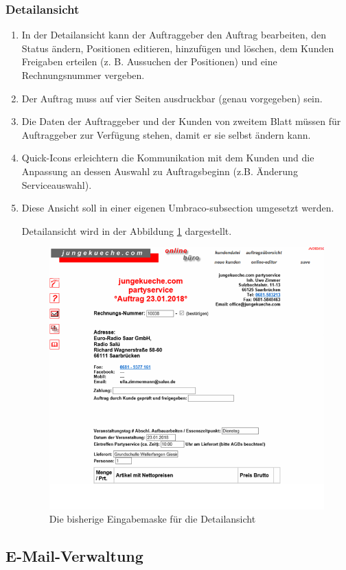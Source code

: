 \subsubsection{Detailansicht}

\begin{enumerate}
	\item In der Detailansicht kann der Auftraggeber den Auftrag bearbeiten, den Status ändern, Positionen editieren, hinzufügen und löschen, dem Kunden Freigaben erteilen (z. B. Aussuchen der Positionen) und eine Rechnungsnummer vergeben.
	\item Der Auftrag muss auf vier Seiten ausdruckbar (genau vorgegeben) sein.
	\item Die Daten der Auftraggeber und der Kunden von zweitem Blatt müssen für Auftraggeber zur Verfügung stehen, damit er sie selbst ändern kann.
	\item Quick-Icons erleichtern die Kommunikation mit dem Kunden und die Anpassung an dessen Auswahl zu Auftragsbeginn (z.B. Änderung Serviceauswahl).
	\item  Diese Ansicht soll in einer eigenen Umbraco-subsection umgesetzt werden.
	
	Detailansicht wird in der Abbildung \ref{fig:Detailansicht} dargestellt.
	\begin{figure}[h]
		\centering
		\includegraphics[width=0.7\linewidth]{Graphics/detailansichtt.png}
		\caption[Detailansicht]{Die bisherige Eingabemaske für die Detailansicht}
		\label{fig:Detailansicht}
	\end{figure}
\end{enumerate} 


\subsection{E-Mail-Verwaltung}

